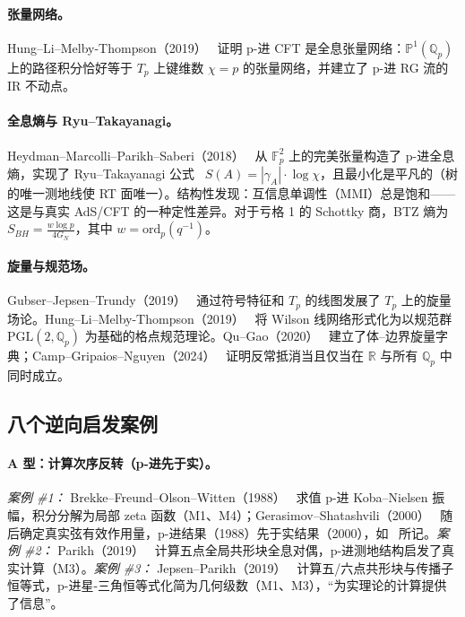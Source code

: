 \documentclass[11pt,a4paper]{ctexart}
\theoremstyle{remark}
\newcommand{\Qp}{\mathbb{Q}_p}
\newcommand{\R}{\mathbb{R}}
\newcommand{\Fp}{\mathbb{F}_p}
\newcommand{\Pone}{\mathbb{P}^1}
\newcommand{\Tp}{T_p}
\newcommand{\PGL}{\mathrm{PGL}}
\begin{document}
\paragraph{张量网络。}
Hung--Li--Melby-Thompson（2019）~\cite{HLM19} 证明 p-进 CFT 是全息张量网络：$\Pone(\Qp)$ 上的路径积分恰好等于 $\Tp$ 上键维数 $\chi = p$ 的张量网络，并建立了 p-进 RG 流的 IR 不动点。

\paragraph{全息熵与 Ryu--Takayanagi。}
Heydman--Marcolli--Parikh--Saberi（2018）~\cite{HMPS18} 从 $\Fp^2$ 上的完美张量构造了 p-进全息熵，实现了 Ryu--Takayanagi 公式~\cite{RT06a,RT06b} $S(A) = |\gamma_A| \cdot \log \chi$，且最小化是平凡的（树的唯一测地线使 RT 面唯一）。结构性发现：互信息单调性（MMI）总是饱和——这是与真实 AdS/CFT 的一种定性差异。对于亏格 1 的 Schottky 商，BTZ 熵为 $S_{BH} = \frac{w \log p}{4 G_N}$，其中 $w = \mathrm{ord}_p(q^{-1})$。

\paragraph{旋量与规范场。}
Gubser--Jepsen--Trundy（2019）~\cite{GJT19} 通过符号特征和 $\Tp$ 的线图发展了 $\Tp$ 上的旋量场论。Hung--Li--Melby-Thompson（2019）~\cite{HLM19b} 将 Wilson 线网络形式化为以规范群 $\PGL(2, \Qp)$ 为基础的格点规范理论。Qu--Gao（2020）~\cite{QG20} 建立了体--边界旋量字典；Camp--Gripaios--Nguyen（2024）~\cite{CGN24} 证明反常抵消当且仅当在 $\R$ 与所有 $\Qp$ 中同时成立。

\subsection{八个逆向启发案例}
\label{sec:type-a}
\label{sec:type-b}

\paragraph{A 型：计算次序反转（p-进先于实）。}
\textit{案例 \#1：} Brekke--Freund--Olson--Witten（1988）~\cite{BFO88} 求值 p-进 Koba--Nielsen 振幅，积分分解为局部 zeta 函数（M1、M4）；Gerasimov--Shatashvili（2000）~\cite{GS00} 随后确定真实弦有效作用量，p-进结果（1988）先于实结果（2000），如~\cite{HJ24} 所记。\textit{案例 \#2：} Parikh（2019）~\cite{P19} 计算五点全局共形块全息对偶，p-进测地结构启发了真实计算（M3）。\textit{案例 \#3：} Jepsen--Parikh（2019）~\cite{JP19a} 计算五/六点共形块与传播子恒等式，p-进星-三角恒等式化简为几何级数（M1、M3），``为实理论的计算提供了信息''。
\end{document}
